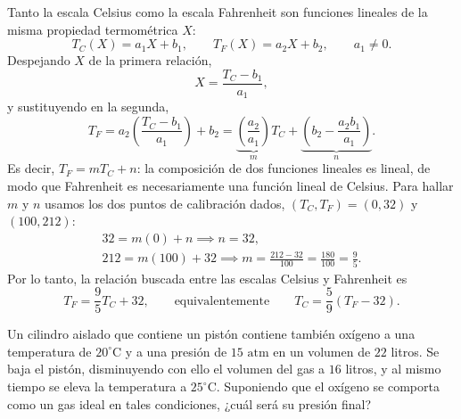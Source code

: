 \documentclass[12pt,a4paper]{article}
\newcommand{\paren}[1]{\left( #1 \right)}
\begin{document}
    \begin{solucion}
        Tanto la escala Celsius como la escala Fahrenheit son funciones lineales de la
        misma propiedad termométrica $X$:
        \begin{equation*}
            T_{C}(X)=a_{1}X+b_{1}, \qquad T_{F}(X)=a_{2}X+b_{2}, \qquad a_{1}\neq0.
        \end{equation*}
        Despejando $X$ de la primera relación,
        \begin{equation*}
            X=\frac{T_{C}-b_{1}}{a_{1}},
        \end{equation*}
        y sustituyendo en la segunda,
        \begin{equation*}
            T_{F}=a_{2}\paren{\frac{T_{C}-b_{1}}{a_{1}}}+b_{2}
            =\underbrace{\paren{\frac{a_{2}}{a_{1}}}}_{m}T_{C}+\underbrace{\paren{b_{2}-\frac{a_{2}b_{1}}{a_{1}}}}_{n}.
        \end{equation*}
        Es decir, $T_{F}=mT_{C}+n$: la composición de dos funciones lineales es lineal, de modo que
        Fahrenheit es necesariamente una función lineal de Celsius. Para hallar $m$ y $n$ usamos
        los dos puntos de calibración dados, $(T_{C},T_{F})=(0,32)$ y $(100,212)$:
        \begin{gather*}
            32=m(0)+n \implies n=32,\\
            212=m(100)+32 \implies m=\frac{212-32}{100}=\frac{180}{100}=\frac{9}{5}.
        \end{gather*}
        Por lo tanto, la relación buscada entre las escalas Celsius y Fahrenheit es
        \begin{equation*}
            T_{F}=\frac{9}{5}T_{C}+32, \qquad \text{equivalentemente}\qquad T_{C}=\frac{5}{9}\paren{T_{F}-32}.
        \end{equation*}
    \end{solucion}

    \begin{problema}
        Un cilindro aislado que contiene un pistón contiene también oxígeno a una temperatura
        de $20^{\circ}\text{C}$ y a una presión de $15\text{ atm}$ en un volumen de $22$ litros.
        Se baja el pistón, disminuyendo con ello el volumen del gas a $16$ litros, y al mismo
        tiempo se eleva la temperatura a $25^{\circ}\text{C}$. Suponiendo que el oxígeno se
        comporta como un gas ideal en tales condiciones, ¿cuál será su presión final?
    \end{problema}
\end{document}
